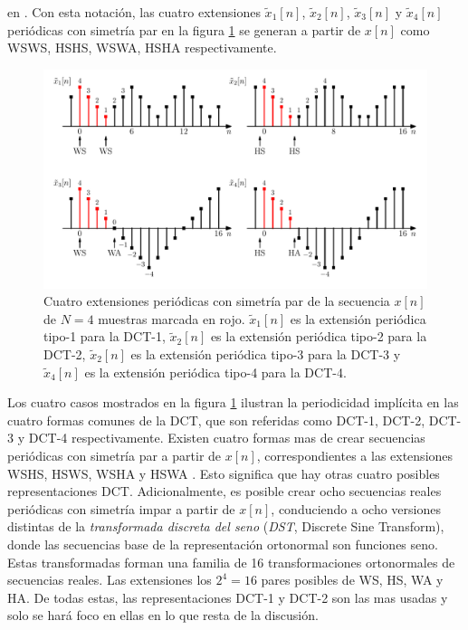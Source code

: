\documentclass[a4paper]{report}
\begin{document}
en \cite{martucci1994symmetric}. Con esta notación, las cuatro extensiones \(\tilde{x}_1[n]\), \(\tilde{x}_2[n]\), \(\tilde{x}_3[n]\) y \(\tilde{x}_4[n]\) periódicas con simetría par  en la figura \ref{fig:dft_dct_periodicity_time} se generan a partir de \(x[n]\) como WSWS, HSHS, WSWA, HSHA respectivamente.
\begin{figure}[!htb]
 \begin{center}
 \includegraphics[width=\textwidth]{figuras/dft_dct_periodicity_time.pdf}
 \caption{\label{fig:dft_dct_periodicity_time} Cuatro extensiones periódicas con simetría par de la secuencia \(x[n]\) de \(N=4\) muestras marcada en rojo. \(\tilde{x}_1[n]\) es la extensión periódica tipo-1 para la DCT-1, \(\tilde{x}_2[n]\) es la extensión periódica tipo-2 para la DCT-2, \(\tilde{x}_2[n]\) es la extensión periódica tipo-3 para la DCT-3 y \(\tilde{x}_4[n]\) es la extensión periódica tipo-4 para la DCT-4.}
 \end{center}
\end{figure}

Los cuatro casos mostrados en la figura \ref{fig:dft_dct_periodicity_time} ilustran la periodicidad implícita en las cuatro formas comunes de la DCT, que son referidas como DCT-1, DCT-2, DCT-3 y DCT-4 respectivamente. Existen cuatro formas mas de crear secuencias periódicas con simetría par a partir de \(x[n]\), correspondientes a las extensiones WSHS, HSWS, WSHA y HSWA \cite{martucci1994symmetric}. Esto significa que hay otras cuatro posibles representaciones DCT. Adicionalmente, es posible crear ocho secuencias reales periódicas con simetría impar a partir de \(x[n]\), conduciendo a ocho versiones distintas de la \emph{transformada discreta del seno} (\emph{DST}, Discrete Sine Transform), donde las secuencias base de la representación ortonormal son funciones seno. Estas transformadas forman una familia de 16 transformaciones ortonormales de secuencias reales. Las extensiones los \(2^4=16\) pares posibles de WS, HS, WA y HA. De todas estas, las representaciones DCT-1 y DCT-2 son las mas usadas y solo se hará foco en ellas en lo que resta de la discusión.
\end{document}
